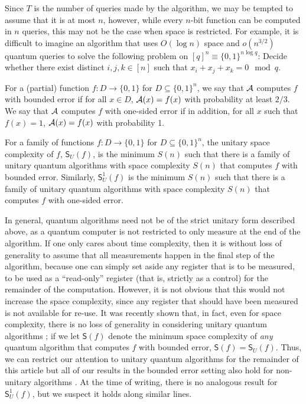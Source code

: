 \documentclass{toc}
\begin{document}
\begin{remark}
Since $T$ is the number of queries made by the algorithm, we may be tempted to assume that it is at most $n$, however, while every $n$-bit function can be computed in $n$ queries, this may not be the case when space is restricted. For example, it is difficult to imagine an algorithm that uses $O(\log n)$ space and $o(n^{3/2})$ quantum queries to solve the following problem on $[q]^n\equiv \{0,1\}^{n\log q}$: Decide whether there exist distinct $i,j,k\in [n]$ such that $x_i+x_j+x_k=0\mod q$. 
\end{remark}


For a (partial) function $f:D\rightarrow\{0,1\}$ for $D\subseteq \{0,1\}^n$, we say that ${\cal A}$ computes $f$ with bounded error if for all $x\in D$, ${\cal A}(x)=f(x)$ with probability at least $2/3$. We say that ${\cal A}$ computes $f$ with one-sided error if in addition, for all $x$ such that $f(x)=1$, ${\cal A}(x)=f(x)$ with probability 1.

\begin{definition}\label{def:unitary-space}
For a family of functions $f:D\rightarrow\{0,1\}$ for $D\subseteq\{0,1\}^n$, the unitary space complexity of $f$, $\mathsf{S}_U(f)$, is the minimum $S(n)$ such that there is a family of unitary quantum algorithms with space complexity $S(n)$ that computes $f$ with bounded error. Similarly, $\mathsf{S}_U^1(f)$ is the minimum $S(n)$ such that there is a family of unitary quantum algorithms with space complexity $S(n)$ that computes $f$ with one-sided error. 
\end{definition}

In general, quantum algorithms need not be of the strict unitary form described above, as a quantum computer is not restricted to only measure at the end of the algorithm. If one only cares about time complexity, then it is without loss of generality to assume that all measurements happen in the final step of the algorithm, because one can simply set aside any register that is to be measured, to be used as a ``read-only'' register (that is, strictly as a control) for the remainder of the computation. However, it is not obvious that this would not increase the space complexity, since any register that should have been measured is not available for re-use. It was recently shown that, in fact, even for space complexity, there is no loss of generality in considering unitary quantum algorithms \cite{FR21,GRZ20}; if we let $\mathsf{S}(f)$ denote the minimum space complexity of \emph{any} quantum algorithm that computes $f$ with bounded error, $\mathsf{S}(f)=\mathsf{S}_U(f)$. Thus, we can restrict our attention to unitary quantum algorithms for the remainder of this
%
article  %
but  all of our results in the bounded error setting also hold for non-unitary algorithms \cite{FR21,GRZ20}. At the time of writing, there is no analogous result for $\mathsf{S}_U^1(f)$, but we suspect it holds along similar lines. 
\end{document}
